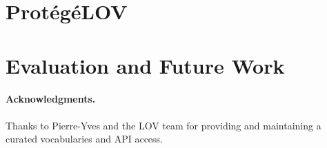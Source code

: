 \documentclass[runningheads,a4paper]{llncs}
\begin{document}

\section{Prot{\'e}g{\'e}LOV}\label{sec:classification}




\section{Evaluation and Future Work}\label{sec:conclusion}





\paragraph{\textbf{Acknowledgments.}} %
Thanks to Pierre-Yves and the LOV team for providing and maintaining a curated vocabularies and API access.


\nocite{*}

\end{document}
